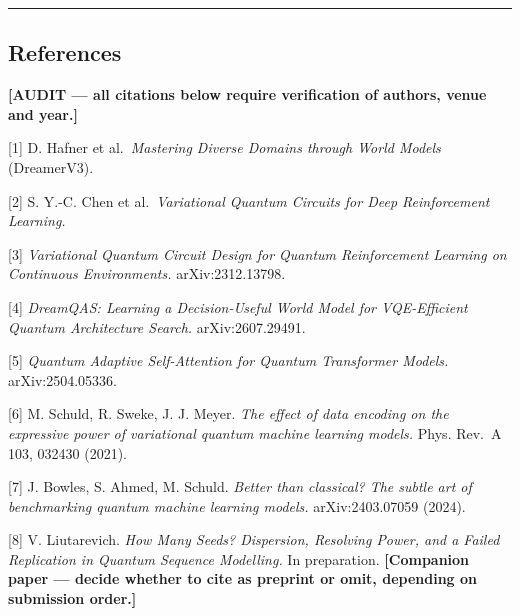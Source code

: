 \documentclass[
  11pt]{article}
\begin{document}
\begin{center}\rule{0.5\linewidth}{0.5pt}\end{center}

\hypertarget{references}{%
\subsection{References}\label{references}}

\textbf{{[}AUDIT --- all citations below require verification of
authors, venue and year.{]}}

{[}1{]} D. Hafner et al.~\emph{Mastering Diverse Domains through World
Models} (DreamerV3).

{[}2{]} S. Y.-C. Chen et al.~\emph{Variational Quantum Circuits for Deep
Reinforcement Learning.}

{[}3{]} \emph{Variational Quantum Circuit Design for Quantum
Reinforcement Learning on Continuous Environments.} arXiv:2312.13798.

{[}4{]} \emph{DreamQAS: Learning a Decision-Useful World Model for
VQE-Efficient Quantum Architecture Search.} arXiv:2607.29491.

{[}5{]} \emph{Quantum Adaptive Self-Attention for Quantum Transformer
Models.} arXiv:2504.05336.

{[}6{]} M. Schuld, R. Sweke, J. J. Meyer. \emph{The effect of data
encoding on the expressive power of variational quantum machine learning
models.} Phys. Rev.~A 103, 032430 (2021).

{[}7{]} J. Bowles, S. Ahmed, M. Schuld. \emph{Better than classical? The
subtle art of benchmarking quantum machine learning models.}
arXiv:2403.07059 (2024).

{[}8{]} V. Liutarevich. \emph{How Many Seeds? Dispersion, Resolving
Power, and a Failed Replication in Quantum Sequence Modelling.} In
preparation. \textbf{{[}Companion paper --- decide whether to cite as
preprint or omit, depending on submission order.{]}}
\end{document}
